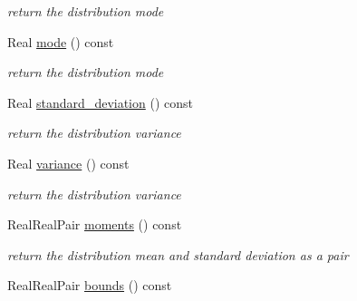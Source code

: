 \begin{DoxyCompactItemize}
\begin{DoxyCompactList}\small\item\em return the distribution mode \end{DoxyCompactList}\item 
Real \hyperlink{classPecos_1_1BoundedNormalRandomVariable_a72d3d6926edd929cb3f8e12baa655f70}{mode} () const \label{classPecos_1_1BoundedNormalRandomVariable_a72d3d6926edd929cb3f8e12baa655f70}

\begin{DoxyCompactList}\small\item\em return the distribution mode \end{DoxyCompactList}\item 
Real \hyperlink{classPecos_1_1BoundedNormalRandomVariable_a6a4ed9624d511f8a4e4f509c82cb0706}{standard\+\_\+deviation} () const \label{classPecos_1_1BoundedNormalRandomVariable_a6a4ed9624d511f8a4e4f509c82cb0706}

\begin{DoxyCompactList}\small\item\em return the distribution variance \end{DoxyCompactList}\item 
Real \hyperlink{classPecos_1_1BoundedNormalRandomVariable_a4b8b05b2a9af92dad9cc304c2925a4eb}{variance} () const \label{classPecos_1_1BoundedNormalRandomVariable_a4b8b05b2a9af92dad9cc304c2925a4eb}

\begin{DoxyCompactList}\small\item\em return the distribution variance \end{DoxyCompactList}\item 
Real\+Real\+Pair \hyperlink{classPecos_1_1BoundedNormalRandomVariable_a80e9024c98c6105a5eace8601a91b3d3}{moments} () const 
\begin{DoxyCompactList}\small\item\em return the distribution mean and standard deviation as a pair \end{DoxyCompactList}\item 
Real\+Real\+Pair \hyperlink{classPecos_1_1BoundedNormalRandomVariable_a4bdb95a8fa5fffaa0de5102f56963cf2}{bounds} () const \label{classPecos_1_1BoundedNormalRandomVariable_a4bdb95a8fa5fffaa0de5102f56963cf2}


\end{DoxyCompactItemize}
